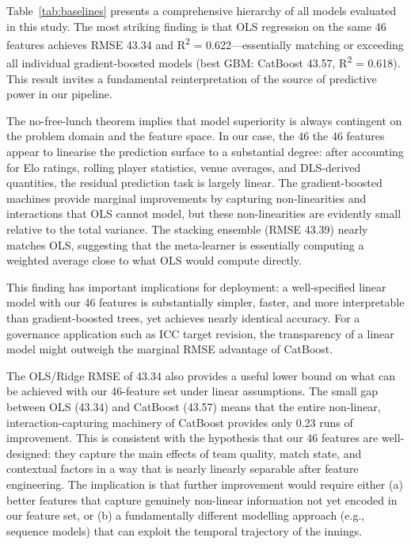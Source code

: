 \documentclass[10pt,a4paper,twocolumn]{article}
\begin{document}
Table~\ref{tab:baselines} presents a comprehensive hierarchy of all models evaluated in this study. The most striking finding is that OLS regression on the same 46 features achieves RMSE 43.34 and R\textsuperscript{2} = 0.622---essentially matching or exceeding all individual gradient-boosted models (best GBM: CatBoost 43.57, R\textsuperscript{2} = 0.618). This result invites a fundamental reinterpretation of the source of predictive power in our pipeline.

The no-free-lunch theorem implies that model superiority is always contingent on the problem domain and the feature space. In our case, the 46 the 46 features appear to linearise the prediction surface to a substantial degree: after accounting for Elo ratings, rolling player statistics, venue averages, and DLS-derived quantities, the residual prediction task is largely linear. The gradient-boosted machines provide marginal improvements by capturing non-linearities and interactions that OLS cannot model, but these non-linearities are evidently small relative to the total variance. The stacking ensemble (RMSE 43.39) nearly matches OLS, suggesting that the meta-learner is essentially computing a weighted average close to what OLS would compute directly.

This finding has important implications for deployment: a well-specified linear model with our 46 features is substantially simpler, faster, and more interpretable than gradient-boosted trees, yet achieves nearly identical accuracy. For a governance application such as ICC target revision, the transparency of a linear model might outweigh the marginal RMSE advantage of CatBoost.

The OLS/Ridge RMSE of 43.34 also provides a useful lower bound on what can be achieved with our 46-feature set under linear assumptions. The small gap between OLS (43.34) and CatBoost (43.57) means that the entire non-linear, interaction-capturing machinery of CatBoost provides only 0.23 runs of improvement. This is consistent with the hypothesis that our 46 features are well-designed: they capture the main effects of team quality, match state, and contextual factors in a way that is nearly linearly separable after feature engineering. The implication is that further improvement would require either (a) better features that capture genuinely non-linear information not yet encoded in our feature set, or (b) a fundamentally different modelling approach (e.g., sequence models) that can exploit the temporal trajectory of the innings.
\end{document}
